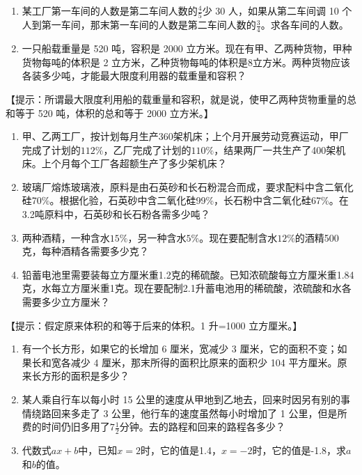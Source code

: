 \begin{enumerate}[start=5]
\item
  某工厂第一车间的人数是第二车间人数的\(\frac{4}{5}\)少 30
  人，如果从第二车间调 10
  个人到第一车间，那末第一车间的人数是第二车间人数的\(\frac{3}{4}\)。求各车间的人数。
\item
  一只船载重量是 520 吨，容积是 2000
  立方米。现在有甲、乙两种货物，甲种货物每吨的体积是 2
  立方米，乙种货物每吨的体积是8立方米。两种货物应该各装多少吨，才能最大限度利用器的载重量和容积？
\end{enumerate}

【提示：所谓最大限度利用船的载重量和容积，就是说，使甲乙两种货物重量的总和等于
520 吨，体积的总和等于 2000 立方米。】

\begin{enumerate}[start=7]
\item
  甲、乙两工厂，按计划每月生产360架机床；上个月开展劳动竞赛运动，甲厂完成了计划的\(112\%\)，乙厂完成了计划的\(110\%\)，结果两厂一共生产了400架机床。上个月每个工厂各超额生产了多少架机床？
\item
  玻璃厂熔炼玻璃液，原料是由石英砂和长石粉混合而成，要求配料中含二氧化硅70\%。根据化验，石英砂中含二氧化硅99\%，长石粉中含二氧化硅67\%。在3.2吨原料中，石英砂和长石粉各需多少吨？
\item
  两种酒精，一种含水\(15\%\)，另一种含水\(5\%\)。现在要配制含水\(12\%\)的酒精500克，每种酒精各需要多少克？
\item
  铅蓄电池里需要装每立方厘米重1.2克的稀硫酸。已知浓硫酸每立方厘米重1.84克，水每立方厘米重1克。现在要配制2.1升蓄电池用的稀硫酸，浓硫酸和水各需要多少立方厘米？
\end{enumerate}

【提示：假定原来体积的和等于后来的体积。1 升=1000 立方厘米。】

\begin{enumerate}[start=11]
\item
  有一个长方形，如果它的长增加 6 厘米，宽减少 3
  厘米，它的面积不变；如果长和宽各减少 4
  厘米，那末所得的面积比原来的面积少 104
  平方厘米。原来长方形的面积是多少？
\item
  某人乘自行车以每小时 15
  公里的速度从甲地到乙地去，回来时因另有别的事情绕路回来多走了 3
  公里，他行车的速度虽然每小时增加了 1
  公里，但是所费的时间仍旧多用了\(7 \frac{1}{2}\)分钟。去的路程和回来的路程各多少？
\item
  代数式\(ax + b\)中，已知\(x = 2\)时，它的值是1.4，\(x = -2\)时，它的值是-1.8，求\(a\)和\(b\)的值。
\end{enumerate}

